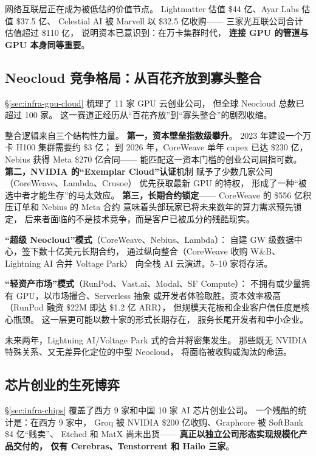 网络互联层正在成为被低估的价值节点。
Lightmatter 估值 \$44 亿、Ayar Labs 估值 \$37.5 亿、
Celestial AI 被 Marvell 以 \$32.5 亿收购——
三家光互联公司合计估值超过 \$110 亿，
说明资本已意识到：在万卡集群时代，
\textbf{连接 GPU 的管道与 GPU 本身同等重要}。

\subsection{Neocloud 竞争格局：从百花齐放到寡头整合}

\S\ref{sec:infra-gpu-cloud} 梳理了 11 家 GPU 云创业公司，
但全球 Neocloud 总数已超过 100 家。
这一赛道正经历从``百花齐放''到``寡头整合''的剧烈收缩。

整合逻辑来自三个结构性力量。
\textbf{第一，资本壁垒指数级攀升}。
2023 年建设一个万卡 H100 集群需要约 \$3 亿；
到 2026 年，CoreWeave 单年 capex 已达 \$230 亿，
Nebius 获得 Meta \$270 亿合同——
能匹配这一资本门槛的创业公司屈指可数。
\textbf{第二，NVIDIA 的``Exemplar Cloud''认证}机制
赋予了少数几家公司（CoreWeave、Lambda、Crusoe）
优先获取最新 GPU 的特权，
形成了一种``被选中者才能生存''的马太效应。
\textbf{第三，长期合约锁定}——
CoreWeave 的 \$556 亿积压订单和 Nebius 的 Meta 合约
意味着头部玩家已将未来数年的算力需求预先锁定，
后来者面临的不是技术竞争，而是客户已被瓜分的残酷现实。

\begin{corebox}
\textbf{``超级 Neocloud''模式}（CoreWeave、Nebius、Lambda）：
自建 GW 级数据中心，签下数十亿美元长期合约，
通过纵向整合（CoreWeave 收购 W\&B、Lightning AI 合并 Voltage Park）
向全栈 AI 云演进。5--10 家将存活。

\textbf{``轻资产市场''模式}（RunPod、Vast.ai、Modal、SF Compute）：
不拥有或少量拥有 GPU，以市场撮合、Serverless 抽象
或开发者体验取胜。资本效率极高
（RunPod 融资 \$22M 即达 \$1.2 亿 ARR），
但规模天花板和企业客户信任度是核心瓶颈。
这一层更可能以数十家的形式长期存在，
服务长尾开发者和中小企业。
\end{corebox}

未来两年，Lightning AI/Voltage Park 式的合并将密集发生。
那些既无 NVIDIA 特殊关系、又无差异化定位的中型 Neocloud，
将面临被收购或淘汰的命运。

\subsection{芯片创业的生死博弈}

\S\ref{sec:infra-chips} 覆盖了西方 9 家和中国 10 家 AI 芯片创业公司。
一个残酷的统计是：在西方 9 家中，
Groq 被 NVIDIA \$200 亿收购、Graphcore 被 SoftBank \$4 亿``贱卖''、
Etched 和 MatX 尚未出货——
\textbf{真正以独立公司形态实现规模化产品交付的，
仅有 Cerebras、Tenstorrent 和 Hailo 三家}。

